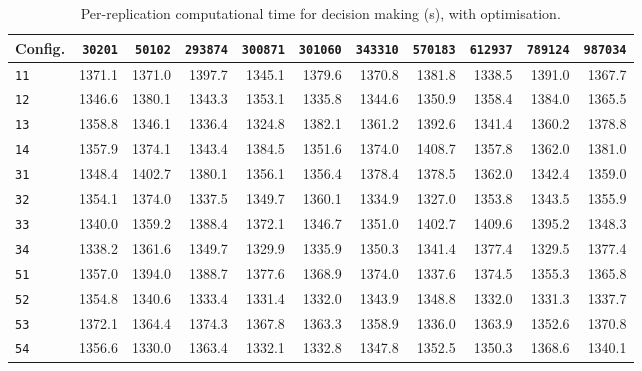\begin{table}[htb]
\centering
\small
\caption{Per-replication computational time for decision making (s), with optimisation.}
\label{tab:app_time_opt_true}
\begin{tabular}{@{}lrrrrrrrrrr@{}}
\toprule
\textbf{Config.} & \texttt{30201} & \texttt{50102} & \texttt{293874} & \texttt{300871} & \texttt{301060} & \texttt{343310} & \texttt{570183} & \texttt{612937} & \texttt{789124} & \texttt{987034} \\
\midrule
\texttt{11} & 1371.1 & 1371.0 & 1397.7 & 1345.1 & 1379.6 & 1370.8 & 1381.8 & 1338.5 & 1391.0 & 1367.7 \\
\texttt{12} & 1346.6 & 1380.1 & 1343.3 & 1353.1 & 1335.8 & 1344.6 & 1350.9 & 1358.4 & 1384.0 & 1365.5 \\
\texttt{13} & 1358.8 & 1346.1 & 1336.4 & 1324.8 & 1382.1 & 1361.2 & 1392.6 & 1341.4 & 1360.2 & 1378.8 \\
\texttt{14} & 1357.9 & 1374.1 & 1343.4 & 1384.5 & 1351.6 & 1374.0 & 1408.7 & 1357.8 & 1362.0 & 1381.0 \\
\texttt{31} & 1348.4 & 1402.7 & 1380.1 & 1356.1 & 1356.4 & 1378.4 & 1378.5 & 1362.0 & 1342.4 & 1359.0 \\
\texttt{32} & 1354.1 & 1374.0 & 1337.5 & 1349.7 & 1360.1 & 1334.9 & 1327.0 & 1353.8 & 1343.5 & 1355.9 \\
\texttt{33} & 1340.0 & 1359.2 & 1388.4 & 1372.1 & 1346.7 & 1351.0 & 1402.7 & 1409.6 & 1395.2 & 1348.3 \\
\texttt{34} & 1338.2 & 1361.6 & 1349.7 & 1329.9 & 1335.9 & 1350.3 & 1341.4 & 1377.4 & 1329.5 & 1377.4 \\
\texttt{51} & 1357.0 & 1394.0 & 1388.7 & 1377.6 & 1368.9 & 1374.0 & 1337.6 & 1374.5 & 1355.3 & 1365.8 \\
\texttt{52} & 1354.8 & 1340.6 & 1333.4 & 1331.4 & 1332.0 & 1343.9 & 1348.8 & 1332.0 & 1331.3 & 1337.7 \\
\texttt{53} & 1372.1 & 1364.4 & 1374.3 & 1367.8 & 1363.3 & 1358.9 & 1336.0 & 1363.9 & 1352.6 & 1370.8 \\
\texttt{54} & 1356.6 & 1330.0 & 1363.4 & 1332.1 & 1332.8 & 1347.8 & 1352.5 & 1350.3 & 1368.6 & 1340.1 \\
\bottomrule
\end{tabular}
\end{table}
